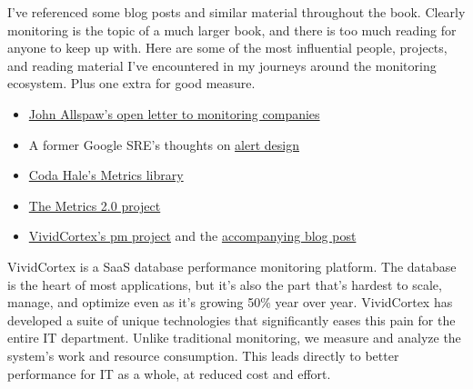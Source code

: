 \documentclass{vivid_layout}
\begin{document}
I've referenced some blog posts and similar material throughout the book.
Clearly monitoring is the topic of a much larger book, and there is too much
reading for anyone to keep up with. Here are some of the most influential
people, projects, and reading material I've encountered in my journeys around
the monitoring ecosystem. Plus one extra for good measure.

\begin{itemize}
\item \href{http://www.kitchensoap.com/2015/05/01/openlettertomonitoringproducts/}{John Allspaw's open letter to monitoring companies}
\item A former Google SRE's thoughts on
\href{https://docs.google.com/document/d/199PqyG3UsyXlwieHaqbGiWVa8eMWi8zzAn0YfcApr8Q/edit}{alert
design}
\item \href{http://metrics.dropwizard.io/}{Coda Hale's Metrics library}
\item \href{http://metrics20.org/}{The Metrics 2.0 project}
\item \href{https://github.com/VividCortex/pm}{VividCortex's pm project} and the
\href{https://www.vividcortex.com/blog/2014/11/06/inside-distributed-architecture/}{accompanying
blog post}
\end{itemize}

\newpage

\begin{about}	%
VividCortex is a SaaS database performance monitoring platform. The database is the heart of most applications, but it's also the part that's hardest to scale, manage, and optimize even as it's growing 50\% year over year. VividCortex has developed a suite of unique technologies that significantly eases this pain for the entire IT department. Unlike traditional monitoring, we measure
and analyze the system's work and resource consumption. This leads directly to better performance for IT as a whole, at reduced cost and effort.
\end{about}
\makeresources	%
\end{document}
